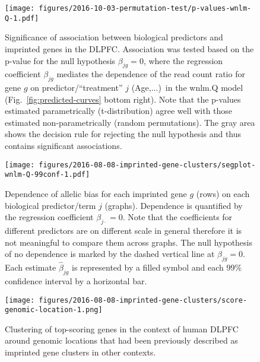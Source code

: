 \documentclass[12pt,letterpaper]{article}
\begin{document}
\begin{figure}[h]
\begin{center}
\texttt{[image: figures/2016-10-03-permutation-test/p-values-wnlm-Q-1.pdf]}
\end{center}
\caption{
Significance of association between biological predictors and imprinted genes
in the DLPFC.  Association was tested based on the p-value for the null
hypothesis \(\beta_{jg}=0\), where the regression coefficient \(\beta_{jg}\)
mediates the dependence of the read count ratio for gene \(g\) on
predictor/``treatment'' \(j\) (Age,...)~in the wnlm.Q model
(Fig.~\ref{fig:predicted-curves} bottom right).  Note that the p-values
estimated parametrically (t-distribution) agree well with those estimated
non-parametrically (random permutations).  The gray area shows the decision
rule for rejecting the null hypothesis and thus contains significant
associations.
}
\label{fig:pval-wnlm.Q}
\end{figure}

\begin{figure}[h]
\begin{center}
\texttt{[image: figures/2016-08-08-imprinted-gene-clusters/segplot-wnlm-Q-99conf-1.pdf]}
\end{center}
\caption{ 
Dependence of allelic bias for each imprinted gene \(g\) (rows)
on each biological predictor/term \(j\) (graphs).  Dependence is quantified by the regression coefficient
\(\beta_{j\cdot} = 0\).  Note that the coefficients for different predictors
are on different scale in general therefore it is not meaningful to compare them across
graphs.  The null hypothesis of no dependence is marked by the dashed
vertical line at \(\beta_{jg}=0\).  Each estimate \(\hat{\beta}_{jg}\) is
represented by a filled symbol and each 99\% confidence interval by a horizontal
bar.
}
\label{fig:biol-effects-wnlm.Q}
\end{figure}


\setcounter{table}{0}
\makeatletter 
\renewcommand{\thetable}{S\@arabic\c@table}
\makeatother

\setcounter{figure}{0}
\makeatletter 
\renewcommand{\thefigure}{S\@arabic\c@figure}
\makeatother

\begin{figure}[h]
\begin{center}
\texttt{[image: figures/2016-08-08-imprinted-gene-clusters/score-genomic-location-1.png]}
\end{center}
\caption{
Clustering of top-scoring genes in the context of human DLPFC around genomic locations that
had been previously described as imprinted gene clusters in other contexts.
}
\label{fig:clusters}
\end{figure}
\end{document}
